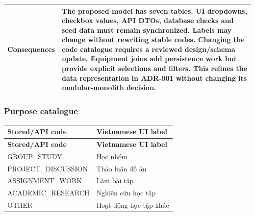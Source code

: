 \begin{longtable}{|p{}|p{}|}
Consequences & The proposed model has seven tables.\allowbreak{} UI dropdowns, checkbox values, API DTOs, database checks and seed data must remain synchronized.\allowbreak{} Labels may change without rewriting stable codes.\allowbreak{} Changing the code catalogue requires a reviewed design/\allowbreak{}schema update.\allowbreak{} Equipment joins add persistence work but provide explicit selections and filters.\allowbreak{} This refines the data representation in ADR-\allowbreak{}001 without changing its modular-\allowbreak{}monolith decision.\allowbreak{} \\ \hline

\end{longtable}

\vspace{2mm}

\subsubsection{Purpose catalogue}

\begin{longtable}{|p{}|p{}|}

\hline

\textbf{Stored/\allowbreak{}API code} & \textbf{Vietnamese UI label} \\ \hline

\endfirsthead

\hline

\textbf{Stored/\allowbreak{}API code} & \textbf{Vietnamese UI label} \\ \hline

\endhead

GROUP\_\allowbreak{}STUDY & Học nhóm \\ \hline

PROJECT\_\allowbreak{}DISCUSSION & Thảo luận đồ án \\ \hline

ASSIGNMENT\_\allowbreak{}WORK & Làm bài tập \\ \hline

ACADEMIC\_\allowbreak{}RESEARCH & Nghiên cứu học tập \\ \hline

OTHER & Hoạt động học tập khác \\ \hline

\end{longtable}

\vspace{2mm}

